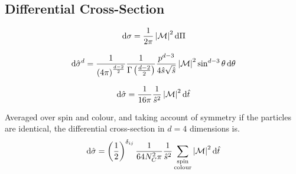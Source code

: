 \documentclass[../main.tex]{subfiles}
\begin{document}
\subsection{Differential Cross-Section}
\begin{equation}
  \label{par:eq:diff_xsec_formula}
  \mathrm{d}\sigma = \frac{1}{2\pi} \left|\mathcal{M}\right|^2 \mathrm{d}\Pi
\end{equation}

\begin{equation}
  \mathrm{d}\hat{\sigma}^d = \frac{1}{\left(4\pi\right)^{\frac{d-2}{2}}}
  \frac{1}{\Gamma\left(\frac{d-2}{2}\right)}
  \frac{p^{d-3}}{4\hat{s}\sqrt{\hat{s}}}
  \left|\mathcal{M}\right|^2 \sin^{d-3}\theta\, \mathrm{d}\theta
\end{equation}

\begin{equation}
  \mathrm{d}\hat{\sigma} = \frac{1}{16\pi} \frac{1}{\hat{s}^2} \left|\mathcal{M}\right|^2
  \mathrm{d}\hat{t}
\end{equation}

Averaged over spin and colour, and taking account of symmetry if the particles
are identical, the differential cross-section in \(d=4\) dimensions is.
\begin{equation}
  \mathrm{d}\hat{\sigma} = \left(\frac{1}{2}\right)^{\delta_{ij}}
  \frac{1}{64 N_C^2 \pi} \frac{1}{\hat{s}^2}
  \sum_{\substack{\text{spin}\\\text{colour}}} \left|\mathcal{M}\right|^2
  \mathrm{d}\hat{t}
\end{equation}


\end{document}
